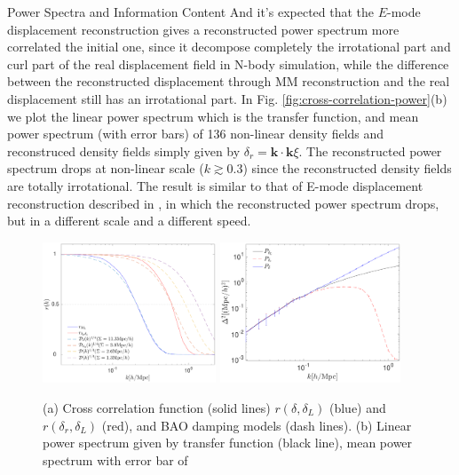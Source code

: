 \begin{section}{Power Spectra and Information Content}
And it's expected that the $E$-mode displacement reconstruction gives a reconstructed power spectrum more correlated 
the initial one, since it decompose completely the irrotational part and curl part of the real displacement 
field in N-body simulation, while the difference between the reconstructed displacement through MM reconstruction 
and the real displacement still has an irrotational part.
 In Fig. \ref{fig:cross-correlation-power}(b) we plot the linear power spectrum which is the transfer function, and mean 
power spectrum (with error bars) of 136 non-linear density fields and reconstruced density fields simply 
given by $\delta_r=\bm{k}\cdot\bm{k}\xi$. The reconstructed power spectrum drops at non-linear scale ($k \gtrsim 0.3$) 
since the reconstructed density fields are totally irrotational. The result is similar to that of 
E-mode displacement reconstruction described in \cite{bib:Yu2016}, in which the reconstructed power spectrum 
drops, but in a different scale and a different speed.
\begin{figure}
\centering
\includegraphics[width=0.46\textwidth]{cross_correlation_best_analysis-crop.pdf} 
\includegraphics[width=0.48\textwidth]{power_best_analysis-crop.pdf}
\caption{(a) Cross correlation function (solid lines) $r(\delta,\delta_L)$ (blue) and $r(\delta_r,\delta_L)$ (red), 
and BAO damping models (dash lines). 
(b) Linear power spectrum given by transfer function (black line), mean power spectrum with error bar of
}
\end{figure}
\end{section}
